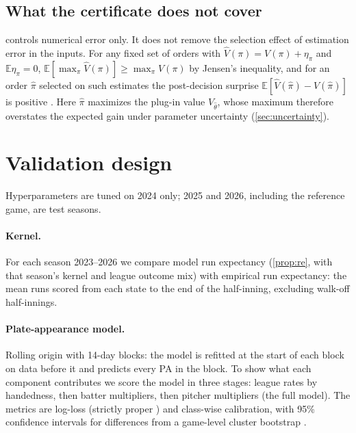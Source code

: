 \documentclass[11pt]{article}
\theoremstyle{definition}
\theoremstyle{remark}
\newcommand{\E}{\mathbb{E}}
\begin{document}
\subsection{What the certificate does not cover}

 controls numerical error only. It does not remove the selection effect of
estimation error in the inputs. For any fixed set of orders with
$\hat V(\pi)=V(\pi)+\eta_\pi$ and $\E\eta_\pi=0$, $\E[\max_\pi\hat V(\pi)]\ge\max_\pi V(\pi)$ by
Jensen's inequality, and for an order $\hat\pi$ selected on such estimates the post-decision
surprise $\E[\hat V(\hat\pi)-V(\hat\pi)]$ is positive \cite{smith2006}. Here $\hat\pi$ maximizes the
plug-in value $V_{\hat\theta}$, whose maximum therefore overstates the expected gain under parameter
uncertainty (\cref{sec:uncertainty}).

\section{Validation design}\label{sec:experiments}

Hyperparameters are tuned on 2024 only; 2025 and 2026, including the reference game, are test
seasons.

\paragraph{Kernel.} For each season 2023--2026 we compare model run expectancy
(\cref{prop:re}, with that season's kernel and league outcome mix) with empirical run expectancy:
the mean runs scored from each state to the end of the half-inning, excluding walk-off
half-innings.

\paragraph{Plate-appearance model.} Rolling origin with 14-day blocks: the model is refitted
at the start of each block on data before it and predicts every PA in the block. To show what each
component contributes we score the model in three stages: league rates by handedness, then batter
multipliers, then pitcher multipliers (the full model). The metrics are log-loss (strictly proper
\cite{gneiting2007}) and class-wise calibration, with 95\% confidence intervals for differences from
a game-level cluster bootstrap \cite{efron1993}.
\end{document}
